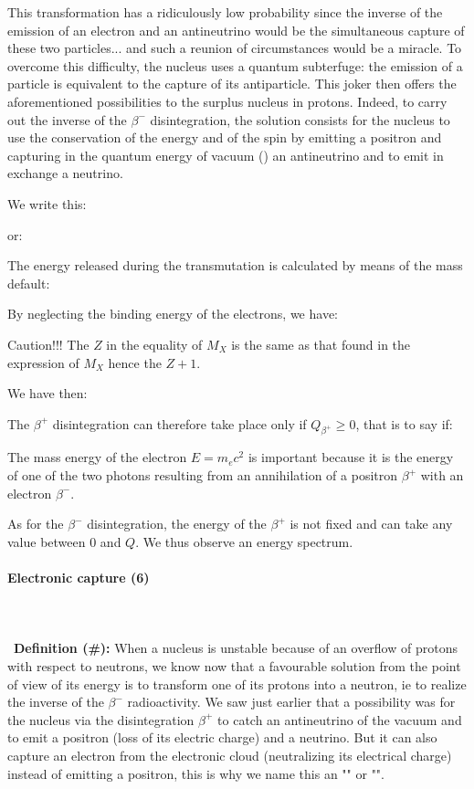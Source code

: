 	This transformation has a ridiculously low probability since the inverse of the emission of an electron and an antineutrino would be the simultaneous capture of these two particles... and such a reunion of circumstances would be a miracle. To overcome this difficulty, the nucleus uses a quantum subterfuge: the emission of a particle is equivalent to the capture of its antiparticle. This joker then offers the aforementioned possibilities to the surplus nucleus in protons. Indeed, to carry out the inverse of the $\beta^{-}$ disintegration, the solution consists for the nucleus to use the conservation of the energy and of the spin by emitting a positron and capturing in the quantum energy of vacuum () an antineutrino and to emit in exchange a neutrino.

	We write this:
	
	or:
	
	The energy released during the transmutation is calculated by means of the mass default:
	
	By neglecting the binding energy of the electrons, we have:
	
	
	\begin{tcolorbox}[colback=red!5,borderline={1mm}{2mm}{red!5},arc=0mm,boxrule=0pt]
	\bcbombe Caution!!! The $Z$ in the equality of $M_X$ is the same as that found in the expression of $M_X$ hence the $Z + 1$.
	\end{tcolorbox}
	

	We have then:
	
	The $\beta^+$ disintegration can therefore take place only if $Q_{\beta^{+}}\ge 0$, that is to say if:
	
	The mass energy of the electron $E=m_ec^2$ is important because it is the energy of one of the two photons resulting from an annihilation of a positron $\beta^{+}$ with an electron $\beta^{-}$.

	As for the $\beta^{-}$ disintegration, the energy of the $\beta^{+}$ is not fixed and can take any value between $0$ and $Q$. We thus observe an energy spectrum.

	\paragraph{Electronic capture (6)}\label{electron capture}\mbox{}\\\\\
	\textbf{Definition (\#\mydef):} When a nucleus is unstable because of an overflow of protons with respect to neutrons, we know now that a favourable solution from the point of view of its energy is to transform one of its protons into a neutron, ie to realize the inverse of the $\beta^{-}$ radioactivity. We saw just earlier that a possibility was for the nucleus via the disintegration $\beta^{+}$ to catch an antineutrino of the vacuum and to emit a positron (loss of its electric charge) and a neutrino. But it can also capture an electron from the electronic cloud (neutralizing its electrical charge) instead of emitting a positron, this is why we name this an "" or "".

